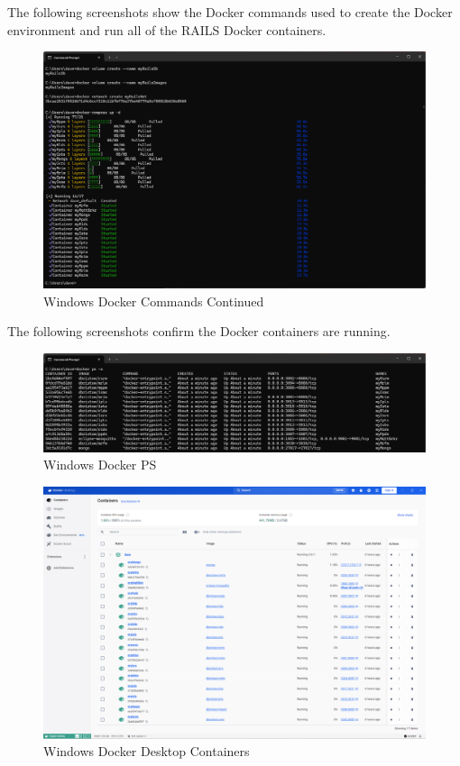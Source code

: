 The following screenshots show the Docker commands used to create the Docker environment and run all of the \ac{RAILS} Docker containers.
\begin{figure}[H]
    \centering
    \includegraphics[scale=0.4]{win2.png}
    \caption{Windows Docker Commands Continued}
    \label{fig:docker-cmds} 
\end{figure}
The following screenshots confirm the Docker containers are running.
\begin{figure}[H]
    \centering
    \includegraphics[scale=0.4]{win3.png}
    \caption{Windows Docker PS}
    \label{fig:docker-cmds-2}
\end{figure}
\begin{figure}[H]
    \centering
    \includegraphics[scale=0.33]{dd-containers.png}
    \caption{Windows Docker Desktop Containers}
    \label{fig:docker-cmds-2}
\end{figure}
